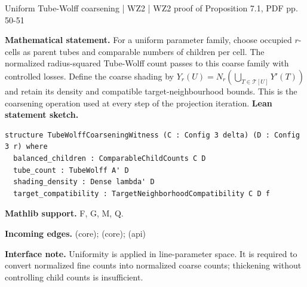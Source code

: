 \documentclass[10pt,a4paper]{article}
\newcommand{\nodecard}[1]{\hyperlink{node-#1}{\texttt{\detokenize{#1}}}}
\begin{document}
\begin{minipage}{\linewidth}
\hypertarget{node-IcoarseTW}{}
\begin{tcolorbox}[colback=white,colframe=cinematicfg,colbacktitle=cinematicbg,coltitle=ink,boxrule=0.45pt,arc=1.6mm,left=3mm,right=3mm,top=2mm,bottom=2mm,title={\sffamily\bfseries WZ2 proof operation \hfill \texttt{IcoarseTW}}]
{\sffamily\small\color{muted}Uniform Tube-Wolff coarsening | WZ2 | WZ2 proof of Proposition 7.1, PDF pp. 50-51}\par
\textbf{Mathematical statement.} For a uniform parameter family, choose occupied $r$-cells as parent tubes and comparable numbers of children per cell.
The normalized radius-squared Tube-Wolff count passes to this coarse family with controlled losses.
Define the coarse shading by $Y_r(U)=N_r(\bigcup_{T\in\mathcal T[U]}Y'(T))$ and retain its density and compatible target-neighbourhood bounds.
This is the coarsening operation used at every step of the projection iteration.
\smallskip\textbf{Lean statement sketch.}
\begin{Verbatim}[fontsize=\small,breaklines=true,breakanywhere=true,tabsize=2]
structure TubeWolffCoarseningWitness (C : Config 3 delta) (D : Config 3 r) where
  balanced_children : ComparableChildCounts C D
  tube_count : TubeWolff A' D
  shading_density : Dense lambda' D
  target_compatibility : TargetNeighborhoodCompatibility C D f
\end{Verbatim}
{\footnotesize\textbf{Mathlib support.} F, G, M, Q.\par
\textbf{Incoming edges.} \nodecard{W2L7_9} (core); \nodecard{W2TW} (core); \nodecard{Imass} (api)\par}
{\footnotesize\textbf{Interface note.} Uniformity is applied in line-parameter space. It is required to convert normalized fine counts into normalized coarse counts; thickening without controlling child counts is insufficient.}
\end{tcolorbox}\end{minipage}\par\medskip
\end{document}
